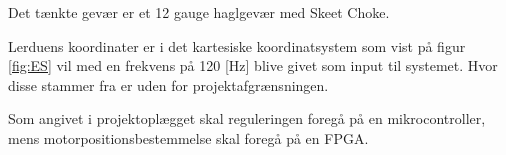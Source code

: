 
Det tænkte gevær er et 12 gauge haglgevær med Skeet Choke.

Lerduens koordinater er i det kartesiske koordinatsystem som vist på figur \ref{fig:ES}
vil med en frekvens på 120 [Hz] blive givet som input til systemet. 
Hvor disse stammer fra er uden for projektafgrænsningen. 

Som angivet i projektoplægget skal reguleringen foregå på en mikrocontroller,
mens motorpositionsbestemmelse skal foregå på en FPGA.